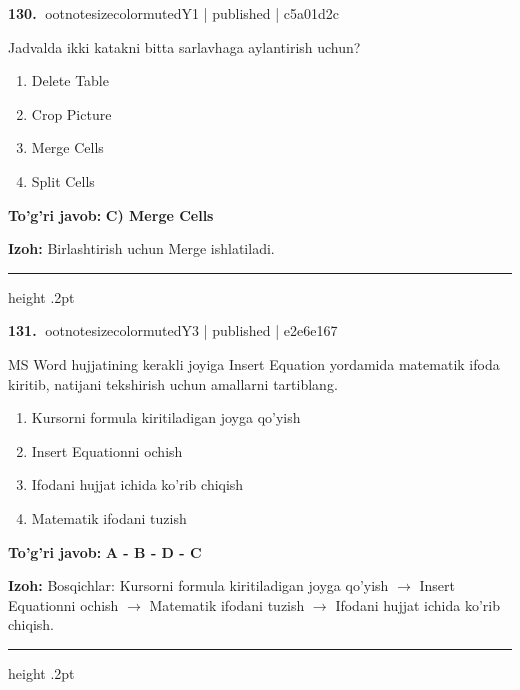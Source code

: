 \documentclass[10pt,a4paper]{article}
\begin{document}
\textbf{\color{ink}130.} {ootnotesizecolor{muted}Y1 | published | c5a01d2c}
\par
Jadvalda ikki katakni bitta sarlavhaga aylantirish uchun?
\begin{enumerate}[label=\Alph*),leftmargin=9mm]
\item Delete Table
\item Crop Picture
\item Merge Cells
\item Split Cells
\end{enumerate}
\begin{tcolorbox}[enhanced,breakable,colback=teal!4,colframe=teal!55!black,boxrule=0.45pt,arc=1.2mm,left=2.8mm,right=2.8mm,top=2mm,bottom=2mm]
\textbf{\color{teal}To'g'ri javob:} \textbf{C) Merge Cells}
\par\smallskip
\textbf{Izoh:} Birlashtirish uchun Merge ishlatiladi.
\end{tcolorbox}
\vspace{2mm}\hrule height .2pt\vspace{2mm}

\textbf{\color{ink}131.} {ootnotesizecolor{muted}Y3 | published | e2e6e167}
\par
MS Word hujjatining kerakli joyiga Insert Equation yordamida matematik ifoda kiritib, natijani tekshirish uchun amallarni tartiblang.
\begin{enumerate}[label=\Alph*),leftmargin=9mm]
\item Kursorni formula kiritiladigan joyga qo'yish
\item Insert Equationni ochish
\item Ifodani hujjat ichida ko'rib chiqish
\item Matematik ifodani tuzish
\end{enumerate}
\begin{tcolorbox}[enhanced,breakable,colback=teal!4,colframe=teal!55!black,boxrule=0.45pt,arc=1.2mm,left=2.8mm,right=2.8mm,top=2mm,bottom=2mm]
\textbf{\color{teal}To'g'ri javob:} \textbf{A - B - D - C}
\par\smallskip
\textbf{Izoh:} Bosqichlar: Kursorni formula kiritiladigan joyga qo'yish \ensuremath{\rightarrow} Insert Equationni ochish \ensuremath{\rightarrow} Matematik ifodani tuzish \ensuremath{\rightarrow} Ifodani hujjat ichida ko'rib chiqish.
\end{tcolorbox}
\vspace{2mm}\hrule height .2pt\vspace{2mm}
\end{document}
